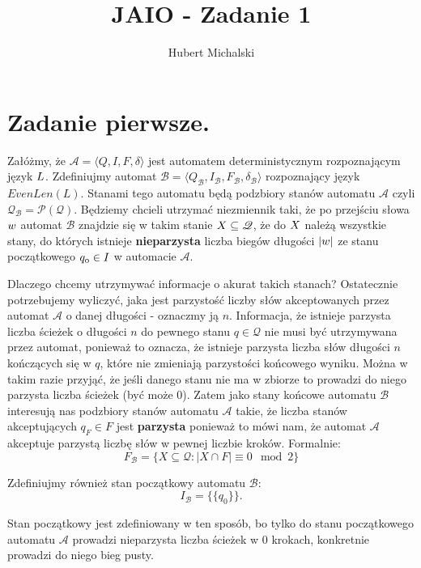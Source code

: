 \documentclass{article}
\title{JAIO - Zadanie 1}
\author{Hubert Michalski}
\begin{document}
\Large
\maketitle

\section{Zadanie pierwsze.}

Załóżmy, że $\mathcal{A}=\langle Q, I, F, \delta \rangle$ jest automatem deterministycznym rozpoznającym język $\mathnormal{L}$. Zdefiniujmy automat $\mathcal{B}=\langle Q_{\mathcal{B}}, I_{\mathcal{B}}, F_{\mathcal{B}}, \delta_{\mathcal{B}} \rangle$ rozpoznający język $EvenLen(L)$. Stanami tego automatu będą podzbiory stanów automatu $\mathcal{A}$ czyli $\mathscr{Q_\mathcal{B}}=\mathcal{P}(\mathscr{Q})$.  Będziemy chcieli utrzymać niezmiennik taki, że po przejściu słowa $\mathnormal{w}$ automat $\mathcal{B}$ znajdzie się w takim stanie $\mathnormal{X}\subseteq\mathscr{Q}$, że do $\mathnormal{X}$ należą wszystkie stany, do których istnieje \textbf{nieparzysta} liczba biegów długości $\mathnormal{|w|}$ ze stanu początkowego $\mathnormal{q_0 \in I}$ w automacie $\mathcal{A}$.

Dlaczego chcemy utrzymywać informacje o akurat takich stanach? Ostatecznie potrzebujemy wyliczyć, jaka jest parzystość liczby słów akceptowanych przez automat $\mathcal{A}$ o danej długości - oznaczmy ją $n$. Informacja, że istnieje parzysta liczba ścieżek o długości $n$ do pewnego stanu $q \in \mathscr{Q}$ nie musi być utrzymywana przez automat, ponieważ to oznacza, że istnieje parzysta liczba słów długości $n$ kończących się w $q$, które nie zmieniają parzystości końcowego wyniku. Można w takim razie przyjąć, że jeśli danego stanu nie ma w zbiorze to prowadzi do niego parzysta liczba ścieżek (być może 0). Zatem jako stany końcowe automatu $\mathcal{B}$ interesują nas podzbiory stanów automatu $\mathcal{A}$ takie, że liczba stanów akceptujących $q_F \in F $ jest \textbf{parzysta} ponieważ to mówi nam, że automat $\mathcal{A}$ akceptuje parzystą liczbę słów w pewnej liczbie kroków. Formalnie:
$$
F_{\mathcal{B}}=\{X\subseteq\mathscr{Q} : |X\cap F| \equiv 0 \mod 2\}
$$

Zdefiniujmy również stan początkowy automatu $\mathcal{B}$:
$$
I_{\mathcal{B}}=\{\{q_0\}\}.
$$

Stan początkowy jest zdefiniowany w ten sposób, bo tylko do stanu początkowego automatu $\mathcal{A}$ prowadzi nieparzysta liczba ścieżek w 0 krokach, konkretnie prowadzi do niego bieg pusty.
\newpage
\end{document}

